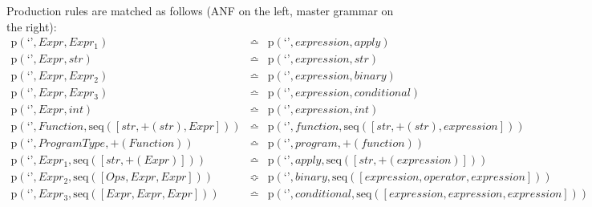 Production rules are matched as follows (ANF on the left, master grammar on the right):
\begin{eqnarray*}
\mathrm{p}\left(\text{`'},\mathit{Expr},\mathit{Expr_1}\right) & \bumpeq & \mathrm{p}\left(\text{`'},\mathit{expression},\mathit{apply}\right) \\
\mathrm{p}\left(\text{`'},\mathit{Expr},str\right) & \bumpeq & \mathrm{p}\left(\text{`'},\mathit{expression},str\right) \\
\mathrm{p}\left(\text{`'},\mathit{Expr},\mathit{Expr_2}\right) & \bumpeq & \mathrm{p}\left(\text{`'},\mathit{expression},\mathit{binary}\right) \\
\mathrm{p}\left(\text{`'},\mathit{Expr},\mathit{Expr_3}\right) & \bumpeq & \mathrm{p}\left(\text{`'},\mathit{expression},\mathit{conditional}\right) \\
\mathrm{p}\left(\text{`'},\mathit{Expr},int\right) & \bumpeq & \mathrm{p}\left(\text{`'},\mathit{expression},int\right) \\
\mathrm{p}\left(\text{`'},\mathit{Function},\mathrm{seq}\left(\left[str, {+}\left(str\right), \mathit{Expr}\right]\right)\right) & \bumpeq & \mathrm{p}\left(\text{`'},\mathit{function},\mathrm{seq}\left(\left[str, {+}\left(str\right), \mathit{expression}\right]\right)\right) \\
\mathrm{p}\left(\text{`'},\mathit{ProgramType},{+}\left(\mathit{Function}\right)\right) & \bumpeq & \mathrm{p}\left(\text{`'},\mathit{program},{+}\left(\mathit{function}\right)\right) \\
\mathrm{p}\left(\text{`'},\mathit{Expr_1},\mathrm{seq}\left(\left[str, {+}\left(\mathit{Expr}\right)\right]\right)\right) & \bumpeq & \mathrm{p}\left(\text{`'},\mathit{apply},\mathrm{seq}\left(\left[str, {+}\left(\mathit{expression}\right)\right]\right)\right) \\
\mathrm{p}\left(\text{`'},\mathit{Expr_2},\mathrm{seq}\left(\left[\mathit{Ops}, \mathit{Expr}, \mathit{Expr}\right]\right)\right) & \Bumpeq & \mathrm{p}\left(\text{`'},\mathit{binary},\mathrm{seq}\left(\left[\mathit{expression}, \mathit{operator}, \mathit{expression}\right]\right)\right) \\
\mathrm{p}\left(\text{`'},\mathit{Expr_3},\mathrm{seq}\left(\left[\mathit{Expr}, \mathit{Expr}, \mathit{Expr}\right]\right)\right) & \bumpeq & \mathrm{p}\left(\text{`'},\mathit{conditional},\mathrm{seq}\left(\left[\mathit{expression}, \mathit{expression}, \mathit{expression}\right]\right)\right) \\
\end{eqnarray*}
